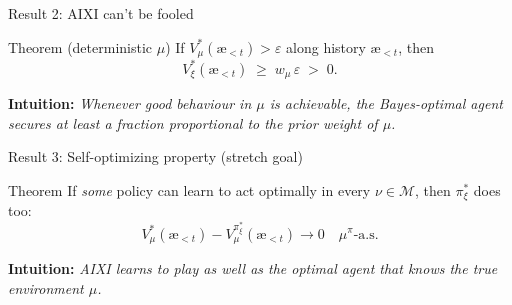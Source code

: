 \documentclass[10pt,aspectratio=169]{beamer}
\newcommand{\cM}{\mathcal{M}}
\newcommand{\aes}{{\text{\ae}}}            %
\begin{document}
\begin{frame}{Result 2: AIXI can't be fooled}
\begin{block}{Theorem (deterministic $\mu$)}
If $V_\mu^*(\aes_{<t}) > \varepsilon$ along history $\aes_{<t}$, then
\[
V_\xi^*(\aes_{<t}) \;\geq\; w_\mu\,\varepsilon \;>\; 0 .
\]
\end{block}
\pause
\textbf{Intuition:} \emph{Whenever good behaviour in $\mu$ is achievable,
the Bayes-optimal agent secures at least a fraction proportional to the prior weight of $\mu$.}
\end{frame}

\begin{frame}{Result 3: Self-optimizing property (stretch goal)}
\begin{block}{Theorem}
If \emph{some} policy can learn to act optimally in every $\nu\in\cM$, then $\pi_\xi^*$ does too:
\[
V_\mu^*(\aes_{<t}) - V_\mu^{\pi_\xi^*}(\aes_{<t}) \to 0 \quad \mu^\pi\text{-a.s.}
\]
\end{block}
\pause
\textbf{Intuition:} \emph{AIXI learns to play as well as the optimal agent that knows the true environment $\mu$.}
\end{frame}
\end{document}
